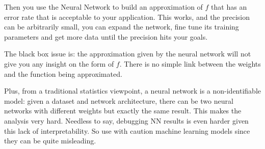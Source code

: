 Then you use the Neural Network to build an approximation of $f$ that has an error rate that is acceptable to your application. This works, and the precision can be arbitrarily small, you can expand the network, fine tune its training parameters and get more data until the precision hits your goals.

The black box issue is: the approximation given by the neural network will not give you any insight on the form of $f$. There is no simple link between the weights and the function being approximated. 

Plus, from a traditional statistics viewpoint, a neural network is a non-identifiable model: given a dataset and network architecture, there can be two neural networks with different weights but exactly the same result. This makes the analysis very hard.
Needless to say, debugging NN results is even harder given this lack of interpretability. So use with caution machine learning models since they can be quite misleading.
 